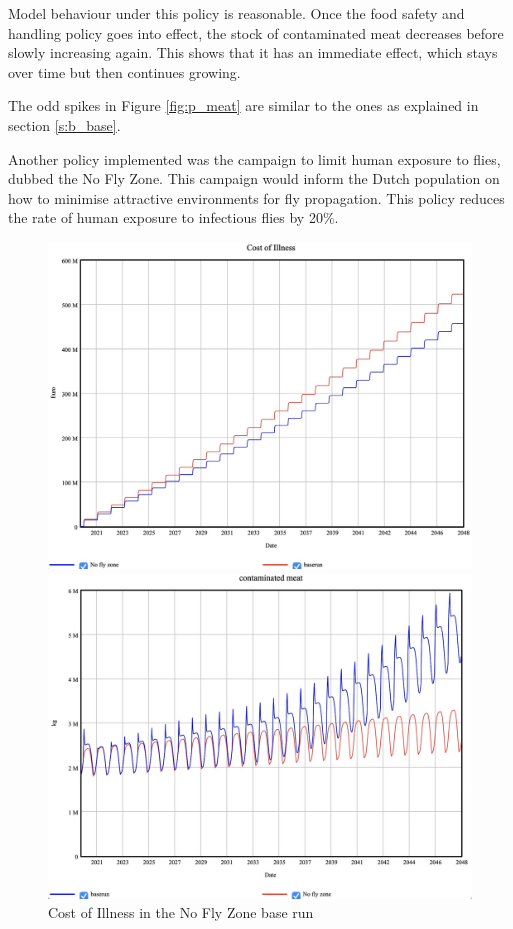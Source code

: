 Model behaviour under this policy is reasonable. Once the food safety and handling policy goes into effect, the stock of contaminated meat decreases before slowly increasing again. This shows that it has an immediate effect, which stays over time but then continues growing. 

The odd spikes in Figure \ref{fig:p_meat} are similar to the ones as explained in section \ref{s:b_base}. 

Another policy implemented was the campaign to limit human exposure to flies, dubbed the No Fly Zone. This campaign would inform the Dutch population on how to minimise attractive environments for fly propagation. This policy reduces the rate of human exposure to infectious flies by 20\%. 

\begin{figure}[h!]
    \centering
    \begin{minipage}{0.45\textwidth}
        \centering
        \includegraphics[width=1\textwidth]{images/p2_coi.jpeg} 
        \caption{Cost of Illness in the No Fly Zone base run}
        \label{fig:p2_coi}
    \end{minipage}\hfill
    \begin{minipage}{0.45\textwidth}
        \centering
        \includegraphics[width=1\textwidth]{images/p2_meat.jpeg}

\end{minipage}
\end{figure}
